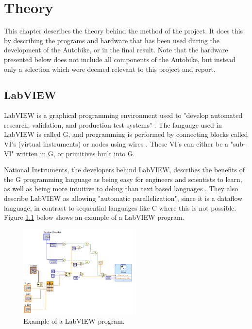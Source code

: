 \chapter{Theory}

This chapter describes the theory behind the method of the project. It does this by describing the programs and hardware that has been used during the development of the Autobike, or in the final result. Note that the hardware presented below does not include all components of the Autobike, but instead only a selection which were deemed relevant to this project and report.

\section{LabVIEW}
LabVIEW is a graphical programming environment used to "develop automated research, validation, and production test systems" \cite{NationalInstruments2022WhatLabVIEW}. The language used in LabVIEW is called G, and programming is performed by connecting blocks called VI's (virtual instruments) or nodes using wires \cite{Andrade1998SoftwareTM}. These VI's can either be a "sub-VI" written in G, or primitives built into G.

National Instruments, the developers behind LabVIEW, describes the benefits of the G programming language as being easy for engineers and scientists to learn, as well as being more intuitive to debug than text based languages \cite{NationalInstruments2022BenefitsLabVIEW}. They also describe LabVIEW as allowing "automatic parallelization", since it is a dataflow language, in contrast to sequential languages like C where this is not possible. Figure \ref{fig:lab-example} below shows an example of a LabVIEW program.

\begin{figure}[H]
    \centering
    \includegraphics[width=6cm]{figure/labview_example.jpg}
    \caption{Example of a LabVIEW program.}
    \label{fig:lab-example}
\end{figure}


